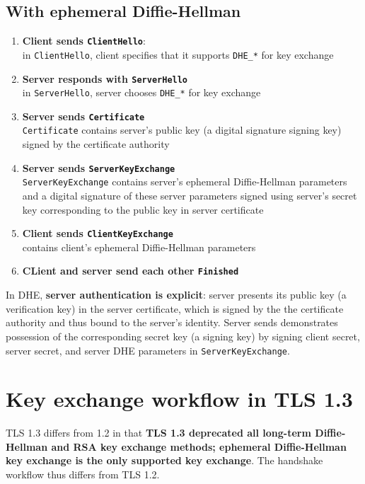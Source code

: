 \documentclass{article}
\begin{document}
\subsection{With ephemeral Diffie-Hellman}
\begin{enumerate}
    \item \textbf{Client sends \texttt{ClientHello}}: \\ in \texttt{ClientHello}, client specifies that it supports \texttt{DHE\_*} for key exchange
    \item \textbf{Server responds with \texttt{ServerHello}} \\ in \texttt{ServerHello}, server chooses \texttt{DHE\_*} for key exchange
    \item \textbf{Server sends \texttt{Certificate}} \\ \texttt{Certificate} contains server's public key (a digital signature signing key) signed by the certificate authority
    \item \textbf{Server sends \texttt{ServerKeyExchange}} \\ \texttt{ServerKeyExchange} contains server's ephemeral Diffie-Hellman parameters and a digital signature of these server parameters signed using server's secret key corresponding to the public key in server certificate
    \item \textbf{Client sends \texttt{ClientKeyExchange}} \\ contains client's ephemeral Diffie-Hellman parameters 
    \item \textbf{CLient and server send each other \texttt{Finished}}
\end{enumerate}

In DHE, \textbf{server authentication is explicit}: server presents its public key (a verification key) in the server certificate, which is signed by the the certificate authority and thus bound to the server's identity. Server sends demonstrates possession of the corresponding secret key (a signing key) by signing client secret, server secret, and server DHE parameters in \texttt{ServerKeyExchange}.

\section{Key exchange workflow in TLS 1.3}
TLS 1.3 differs from 1.2 in that \textbf{TLS 1.3 deprecated all long-term Diffie-Hellman and RSA key exchange methods; ephemeral Diffie-Hellman key exchange is the only supported key exchange}. The handshake workflow thus differs from TLS 1.2.
\end{document}
